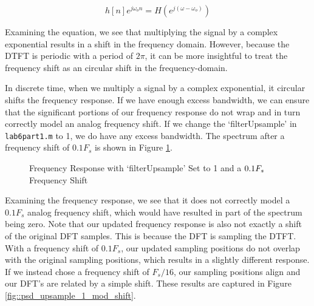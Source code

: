 \documentclass{article}
\begin{document}
\begin{equation}
	h[n]e^{j\omega_on} = H\left(e^{j(\omega-\omega_o)}\right)
\end{equation}

\noindent Examining the equation, we see that multiplying the signal by a complex exponential results in a shift in the frequency domain. However, because the DTFT is periodic with a period of $2\pi$, it can be more insightful to treat the frequency shift as an circular shift in the frequency-domain. 

In discrete time, when we multiply a signal by a complex exponential, it circular shifts the frequency response. If we have enough excess bandwidth, we can ensure that the significant portions of our frequency response do not wrap and in turn correctly model an analog frequency shift. If we change the `filterUpsample' in \texttt{lab6part1.m} to 1, we do have any excess bandwidth. The spectrum after a frequency shift of $0.1F_s$ is shown in Figure \ref{fig::psd_upsample_1}.

\begin{figure}[H]
	\centerline{}
	\caption{Frequency Response with `filterUpsample' Set to 1 and a $\protect{0.1F_s}$ Frequency Shift}
	\label{fig::psd_upsample_1}
\end{figure}

\noindent Examining the frequency response, we see that it does not correctly model a $0.1F_s$ analog frequency shift, which would have resulted in part of the spectrum being zero. Note that our updated frequency response is also not exactly a shift of the original DFT samples. This is because the DFT is sampling the DTFT. With a frequency shift of $0.1F_s$, our updated sampling positions do not overlap with the original sampling positions, which results in a slightly different response. If we instead chose a frequency shift of $F_s/16$, our sampling positions align and our DFT's are related by a simple shift. These results are captured in Figure \ref{fig::psd_upsample_1_mod_shift}.
\end{document}
